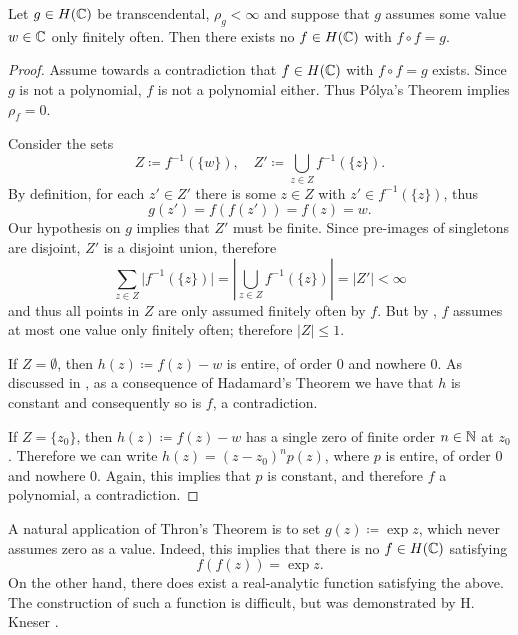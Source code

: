 \begin{theorem}[Thron] \label{thm:thron}
    Let $g \in H(\mathbb{C})$ be transcendental, $\rho_g < \infty$ and suppose that $g$ assumes some value $w \in \mathbb{C}$ only finitely often. Then there exists no $f \in H(\mathbb{C})$ with $f \circ f = g$.
\end{theorem}

\begin{proof}
    Assume towards a contradiction that $f \in H(\mathbb{C})$ with $f \circ f = g$ exists. Since $g$ is not a polynomial, $f$ is not a polynomial either. Thus Pólya's Theorem implies $\rho_f = 0$.
    
    Consider the sets
    $$ Z \coloneqq f^{-1}(\{ w \}), \quad Z' \coloneqq \bigcup_{z \in Z} f^{-1}(\{ z \}). $$
    By definition, for each $z' \in Z'$ there is some $z \in Z$ with $z' \in f^{-1}(\{ z \})$, thus
    $$ g(z') = f(f(z')) = f(z) = w. $$
    Our hypothesis on $g$ implies that $Z'$ must be finite. Since pre-images of singletons are disjoint, $Z'$ is a disjoint union, therefore
    $$ \sum_{z \in Z} \vert f^{-1}(\{ z \}) \vert = \left\vert \bigcup_{z \in Z} f^{-1}(\{ z \}) \right\vert = \vert Z' \vert < \infty $$
    and thus all points in $Z$ are only assumed finitely often by $f$. But by , $f$ assumes at most one value only finitely often; therefore $\vert Z \vert \leq 1$.

    If $Z = \emptyset$, then $h(z) \coloneqq f(z) - w$ is entire, of order $0$ and nowhere $0$. As discussed in , as a consequence of Hadamard's Theorem we have that $h$ is constant and consequently so is $f$, a contradiction.

    If $Z = \{ z_0 \}$, then $h(z) \coloneqq f(z) - w$ has a single zero of finite order $n \in \mathbb{N}$ at $z_0$. Therefore we can write $h(z) = (z - z_0)^n p(z)$, where $p$ is entire, of order $0$ and nowhere $0$. Again, this implies that $p$ is constant, and therefore $f$ a polynomial, a contradiction.
\end{proof}

\begin{example}
    A natural application of Thron's Theorem is to set $g(z) \coloneqq \exp z$, which never assumes zero as a value. Indeed, this implies that there is no $f \in H(\mathbb{C})$ satisfying
    $$ f(f(z)) = \exp z. $$
    On the other hand, there does exist a real-analytic function satisfying the above. The construction of such a function is difficult, but was demonstrated by H. Kneser \cite{kneser-real-analytic-solution}.
\end{example}